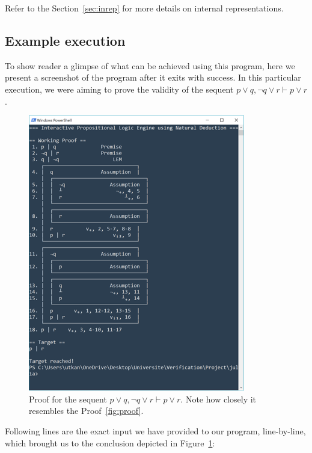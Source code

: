 \documentclass{article}
\newcommand{\seq}{\ensuremath{\vdash}}
\begin{document}
Refer to the Section~\ref{sec:inrep} for more details on internal
representations.

\subsection{Example execution}

To show reader a glimpse of what can be achieved using this program,
here we present a screenshot of the program after it exits with success.
In this particular execution, we were aiming to prove the validity
of the sequent $p \lor q, \neg q \lor r \seq p \lor r$.

\begin{figure}[H]
	\centering
	\includegraphics{example.png}
	\caption{Proof for the sequent $p \lor q, \neg q \lor r \seq p \lor r$.
	Note how closely it resembles the Proof~\ref{fig:proof}.}
	\label{fig:example}
\end{figure}

Following lines are the exact input we have provided to our program,
line-by-line, which brought us to the conclusion depicted in Figure~\ref{fig:example}:
\end{document}
